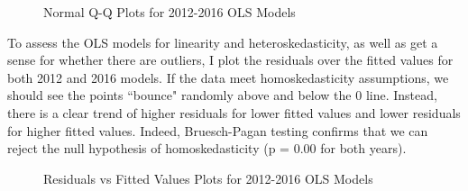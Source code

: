 \documentclass[12pt]{paper}
\begin{document}
\begin{figure}[h!]
	\centering
	\qquad
	\caption{Normal Q-Q Plots for 2012-2016 OLS Models}%
	\label{qq}%
\end{figure}

To assess the OLS models for linearity and heteroskedasticity, as well as get a sense for whether there are outliers, I plot the residuals over the fitted values for both 2012 and 2016 models. If the data meet homoskedasticity assumptions, we should see the points ``bounce" randomly above and below the 0 line. Instead, there is a clear trend of higher residuals for lower fitted values and lower residuals for higher fitted values. Indeed, Bruesch-Pagan testing confirms that we can reject the null hypothesis of homoskedasticity (p = $0.00$ for both years).


\begin{figure}%
	\centering
	\qquad
	\caption{Residuals vs Fitted Values Plots for 2012-2016 OLS Models}%
	\label{resid}%
\end{figure}
\end{document}
